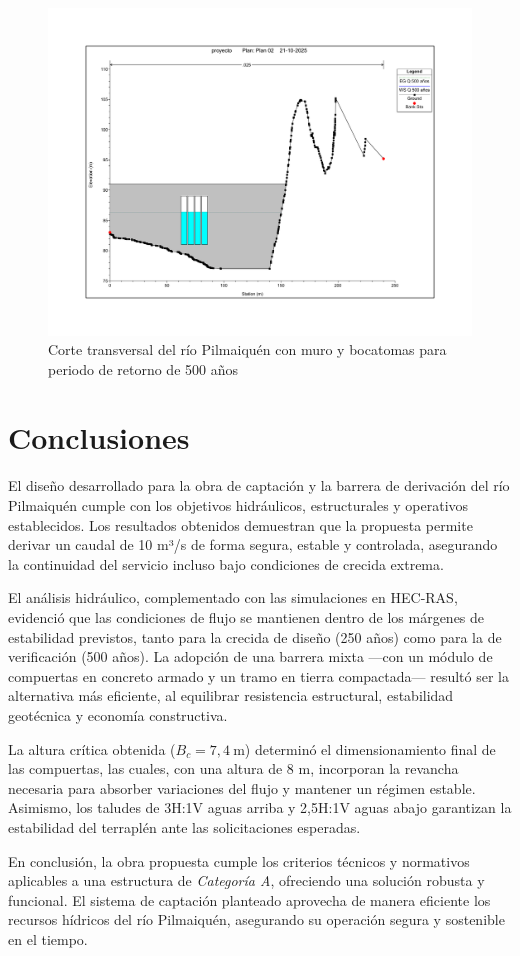 \documentclass{article} %
\begin{document}
\begin{figure}[H]
    \centering
    \includegraphics[width=0.6\linewidth]{imagenes/corte_500_cb.pdf}
    \caption{Corte transversal del río Pilmaiquén con muro y bocatomas para periodo de retorno de 500 años}
\end{figure}

\newpage
\section{Conclusiones}

El diseño desarrollado para la obra de captación y la barrera de derivación del río Pilmaiquén cumple con los objetivos hidráulicos, estructurales y operativos establecidos. Los resultados obtenidos demuestran que la propuesta permite derivar un caudal de 10 m³/s de forma segura, estable y controlada, asegurando la continuidad del servicio incluso bajo condiciones de crecida extrema.

El análisis hidráulico, complementado con las simulaciones en HEC-RAS, evidenció que las condiciones de flujo se mantienen dentro de los márgenes de estabilidad previstos, tanto para la crecida de diseño (250 años) como para la de verificación (500 años). La adopción de una barrera mixta —con un módulo de compuertas en concreto armado y un tramo en tierra compactada— resultó ser la alternativa más eficiente, al equilibrar resistencia estructural, estabilidad geotécnica y economía constructiva.

La altura crítica obtenida (\(B_c = 7{,}4\ \text{m}\)) determinó el dimensionamiento final de las compuertas, las cuales, con una altura de 8 m, incorporan la revancha necesaria para absorber variaciones del flujo y mantener un régimen estable. Asimismo, los taludes de 3H:1V aguas arriba y 2,5H:1V aguas abajo garantizan la estabilidad del terraplén ante las solicitaciones esperadas.

En conclusión, la obra propuesta cumple los criterios técnicos y normativos aplicables a una estructura de \textit{Categoría A}, ofreciendo una solución robusta y funcional. El sistema de captación planteado aprovecha de manera eficiente los recursos hídricos del río Pilmaiquén, asegurando su operación segura y sostenible en el tiempo.
\end{document}
